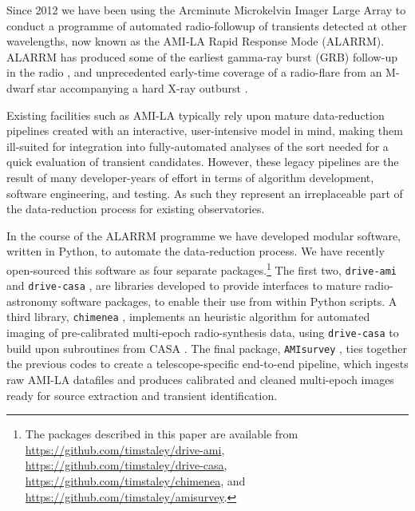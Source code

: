 \documentclass[5p,authoryear]{elsarticle}
\begin{document}
Since 2012 we have been using the Arcminute Microkelvin Imager Large Array \citep[AMI-LA,][]{Zwart2008} to conduct a programme of automated radio-followup of transients detected at other wavelengths, now known as the AMI-LA Rapid Response Mode (ALARRM).
ALARRM has produced some of the earliest 
gamma-ray burst (GRB) follow-up in the radio \citep{Staley2013,Anderson2014},
and unprecedented early-time coverage of a radio-flare from an M-dwarf
star accompanying a hard X-ray outburst \citep{Fender2015}.

Existing facilities such as AMI-LA typically rely upon mature data-reduction pipelines created with an interactive, user-intensive model in mind, making them ill-suited for integration into fully-automated analyses of the sort needed for a quick evaluation of transient candidates. 
However, these legacy pipelines are the result of many developer-years of effort in terms of algorithm development, software engineering, and testing.
As such they represent an irreplaceable part of the data-reduction process for existing observatories. 

In the course of the ALARRM programme we have developed modular software, written in Python, to automate the data-reduction process. 
We have recently open-sourced this software as four separate packages.\footnote{%
The packages described in this paper are available from\\
\url{https://github.com/timstaley/drive-ami},\\
\url{https://github.com/timstaley/drive-casa},\\
\url{https://github.com/timstaley/chimenea}, and\\
\url{https://github.com/timstaley/amisurvey}.
}
The first two, \texttt{drive-ami} and \texttt{drive-casa} \citep{Staley2015_amisurvey, Staley2015_drivecasa}, are libraries developed to provide interfaces to mature radio-astronomy software packages, to enable their use from within Python scripts.
A third library, \texttt{chimenea} \citep{Staley2015_chimenea}, implements an heuristic algorithm for automated imaging of pre-calibrated multi-epoch radio-synthesis data, using \texttt{drive-casa} to build upon subroutines from CASA \citep[the Common Astronomy Software Applications package,][]{McMullin2007, Casa2011}.
The final package, \texttt{AMIsurvey} \citep{Staley2015_amisurvey}, ties together the previous codes to create a telescope-specific end-to-end pipeline, which ingests raw AMI-LA datafiles and produces calibrated and cleaned multi-epoch images ready for source extraction and transient identification.
\end{document}

